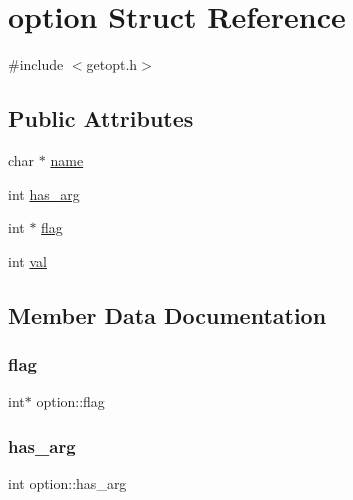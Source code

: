 \hypertarget{structoption}{}\section{option Struct Reference}
\label{structoption}


{\ttfamily \#include $<$getopt.\+h$>$}

\subsection*{Public Attributes}
\begin{DoxyCompactItemize}
\item 
char $\ast$ \hyperlink{structoption_a92c850a23c7828c1dba453bf8d15e1f0}{name}
\item 
int \hyperlink{structoption_a90d7ee9a51eea5c002682dbd0af149e4}{has\+\_\+arg}
\item 
int $\ast$ \hyperlink{structoption_ab366eea5fe7be25c1928328ba715e353}{flag}
\item 
int \hyperlink{structoption_a13bd155ec3b405d29c41ab8d0793be11}{val}
\end{DoxyCompactItemize}


\subsection{Member Data Documentation}
\mbox{\label{structoption_ab366eea5fe7be25c1928328ba715e353}} 
\subsubsection{\texorpdfstring{flag}{flag}}
{\footnotesize\ttfamily int$\ast$ option\+::flag}

\mbox{\label{structoption_a90d7ee9a51eea5c002682dbd0af149e4}} 
\subsubsection{\texorpdfstring{has\+\_\+arg}{has\_arg}}
{\footnotesize\ttfamily int option\+::has\+\_\+arg}

\mbox{\label{structoption_a92c850a23c7828c1dba453bf8d15e1f0}} 
